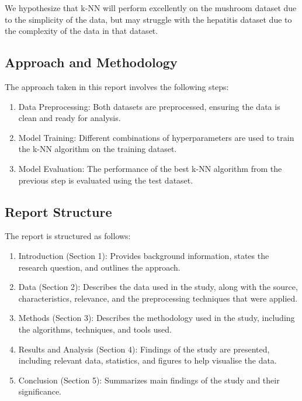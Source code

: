 We hypothesize that k-NN will perform excellently on the mushroom dataset due to the simplicity of the data,
but may struggle with the hepatitis dataset due to the complexity of the data in that dataset.

\subsection{Approach and Methodology}
The approach taken in this report involves the following steps:
\begin{enumerate}
    \item Data Preprocessing: Both datasets are preprocessed, ensuring the data is clean and ready for analysis.
    \item Model Training: Different combinations of hyperparameters are used to train the k-NN algorithm on the training dataset.
    \item Model Evaluation: The performance of the best k-NN algorithm from the previous step is evaluated using the test dataset.
\end{enumerate}

\subsection{Report Structure}
The report is structured as follows:
\begin{enumerate}
    \item Introduction (Section 1): Provides background information, states the research question, and outlines the approach.
    \item Data (Section 2): Describes the data used in the study, along with the source, characteristics, relevance, and the preprocessing techniques that were applied.
    \item Methods (Section 3): Describes the methodology used in the study, including the algorithms, techniques, and tools used.
    \item Results and Analysis (Section 4): Findings of the study are presented, including relevant data, statistics, and figures to help visualise the data.
    \item Conclusion (Section 5): Summarizes main findings of the study and their significance.
\end{enumerate}